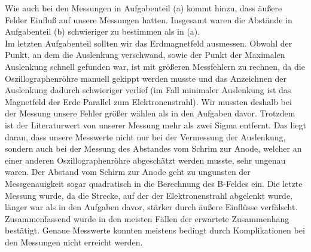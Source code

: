 \documentclass[12pt]{scrartcl}
\begin{document}
Wie auch bei den Messungen in Aufgabenteil (a) kommt hinzu, dass äußere Felder Einfluß auf unsere Messungen hatten.
Insgesamt waren die Abstände in Aufgabenteil (b) schwieriger zu bestimmen als in (a).\\
Im letzten Aufgabenteil sollten wir das Erdmagnetfeld ausmessen. Obwohl der Punkt, an dem die Auslenkung verschwand, sowie der Punkt der Maximalen Auslenkung schnell gefunden war, ist mit größeren Messfehlern zu rechnen, da die Oszillographenröhre manuell gekippt werden musste und das Anzeichnen der Auslenkung dadurch schwieriger verlief (im Fall minimaler Auslenkung ist das Magnetfeld der Erde Parallel zum Elektronenstrahl). Wir mussten deshalb bei der Messung unsere Fehler größer wählen als in den Aufgaben davor. Trotzdem ist der Literaturwert von unserer Messung mehr als  zwei Sigma entfernt. Das liegt daran, dass unsere Messwerte nicht nur bei der Vermessung der Auslenkung, sondern auch bei der Messung des Abstandes vom Schrim zur Anode, welcher an einer anderen Oszillographenröhre abgeschätzt werden musste, sehr ungenau waren.
Der Abstand vom Schirm zur Anode geht zu ungunsten der Messgenauigkeit sogar quadratisch in die Berechnung des B-Feldes ein. Die letzte Messung wurde, da die Strecke, auf der der Elektronenstrahl abgelenkt wurde, länger war als in den Aufgaben davor, stärker durch äußere Einflüsse verfälscht.\\
Zusammenfassend wurde in den meisten Fällen der erwartete Zusammenhang bestätigt. Genaue Messwerte konnten meistens bedingt durch Komplikationen bei den Messungen nicht erreicht werden.
 
\end{document}
